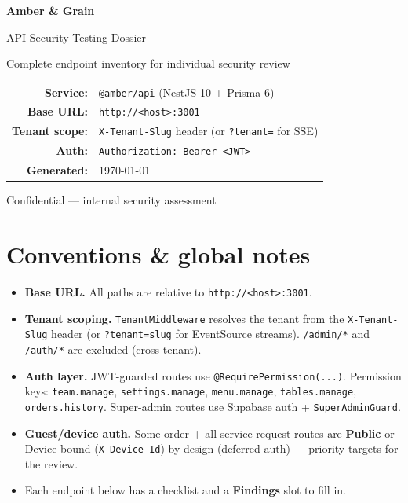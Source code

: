 \documentclass[11pt,a4paper]{article}
\newcommand{\code}[1]{\colorbox{codebg}{\texttt{\small #1}}}
\newcommand{\authPublic}{\textcolor{warn}{\textbf{Public}}}
\newcommand{\authDevice}{\textcolor{muted}{Device-bound (\code{X-Device-Id})}}
\begin{document}
\begin{titlepage}
\centering
\vspace*{3cm}
{\Huge\bfseries\color{brand} Amber \& Grain\par}
\vspace{0.4cm}
{\LARGE API Security Testing Dossier\par}
\vspace{1cm}
{\large\color{muted} Complete endpoint inventory for individual security review\par}
\vspace{2cm}
\begin{tabular}{rl}
\textbf{Service:} & \code{@amber/api} (NestJS 10 + Prisma 6)\\[4pt]
\textbf{Base URL:} & \code{http://<host>:3001}\\[4pt]
\textbf{Tenant scope:} & \code{X-Tenant-Slug} header (or \code{?tenant=} for SSE)\\[4pt]
\textbf{Auth:} & \code{Authorization: Bearer <JWT>}\\[4pt]
\textbf{Generated:} & \today\\
\end{tabular}
\vfill
{\small\color{muted} Confidential — internal security assessment\par}
\end{titlepage}

\tableofcontents
\newpage

\section{Conventions \& global notes}
\begin{itemize}[leftmargin=1.4em]
  \item \textbf{Base URL.} All paths are relative to \code{http://<host>:3001}.
  \item \textbf{Tenant scoping.} \code{TenantMiddleware} resolves the tenant from
        the \code{X-Tenant-Slug} header (or \code{?tenant=slug} for EventSource
        streams). \code{/admin/*} and \code{/auth/*} are excluded (cross-tenant).
  \item \textbf{Auth layer.} JWT-guarded routes use \code{@RequirePermission(...)}.
        Permission keys: \code{team.manage}, \code{settings.manage},
        \code{menu.manage}, \code{tables.manage}, \code{orders.history}.
        Super-admin routes use Supabase auth + \code{SuperAdminGuard}.
  \item \textbf{Guest/device auth.} Some order + all service-request routes are
        \authPublic{} or \authDevice{} by design (deferred auth) — priority
        targets for the review.
  \item Each endpoint below has a checklist and a \textbf{Findings} slot to fill in.
\end{itemize}
\end{document}
